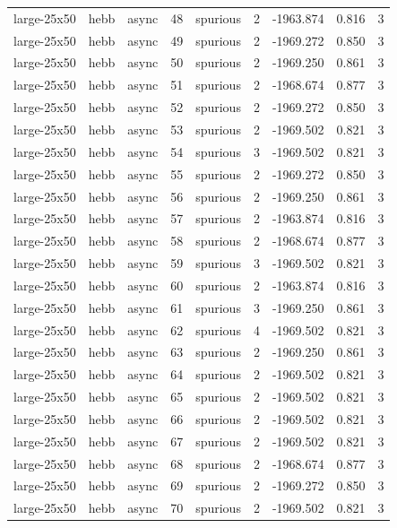\begin{tabular}{lllrlrrrr}
large-25x50 & hebb & async & 48 & spurious & 2 & -1963.874 & 0.816 & 3 \\
large-25x50 & hebb & async & 49 & spurious & 2 & -1969.272 & 0.850 & 3 \\
large-25x50 & hebb & async & 50 & spurious & 2 & -1969.250 & 0.861 & 3 \\
large-25x50 & hebb & async & 51 & spurious & 2 & -1968.674 & 0.877 & 3 \\
large-25x50 & hebb & async & 52 & spurious & 2 & -1969.272 & 0.850 & 3 \\
large-25x50 & hebb & async & 53 & spurious & 2 & -1969.502 & 0.821 & 3 \\
large-25x50 & hebb & async & 54 & spurious & 3 & -1969.502 & 0.821 & 3 \\
large-25x50 & hebb & async & 55 & spurious & 2 & -1969.272 & 0.850 & 3 \\
large-25x50 & hebb & async & 56 & spurious & 2 & -1969.250 & 0.861 & 3 \\
large-25x50 & hebb & async & 57 & spurious & 2 & -1963.874 & 0.816 & 3 \\
large-25x50 & hebb & async & 58 & spurious & 2 & -1968.674 & 0.877 & 3 \\
large-25x50 & hebb & async & 59 & spurious & 3 & -1969.502 & 0.821 & 3 \\
large-25x50 & hebb & async & 60 & spurious & 2 & -1963.874 & 0.816 & 3 \\
large-25x50 & hebb & async & 61 & spurious & 3 & -1969.250 & 0.861 & 3 \\
large-25x50 & hebb & async & 62 & spurious & 4 & -1969.502 & 0.821 & 3 \\
large-25x50 & hebb & async & 63 & spurious & 2 & -1969.250 & 0.861 & 3 \\
large-25x50 & hebb & async & 64 & spurious & 2 & -1969.502 & 0.821 & 3 \\
large-25x50 & hebb & async & 65 & spurious & 2 & -1969.502 & 0.821 & 3 \\
large-25x50 & hebb & async & 66 & spurious & 2 & -1969.502 & 0.821 & 3 \\
large-25x50 & hebb & async & 67 & spurious & 2 & -1969.502 & 0.821 & 3 \\
large-25x50 & hebb & async & 68 & spurious & 2 & -1968.674 & 0.877 & 3 \\
large-25x50 & hebb & async & 69 & spurious & 2 & -1969.272 & 0.850 & 3 \\
large-25x50 & hebb & async & 70 & spurious & 2 & -1969.502 & 0.821 & 3 \\

\end{tabular}
